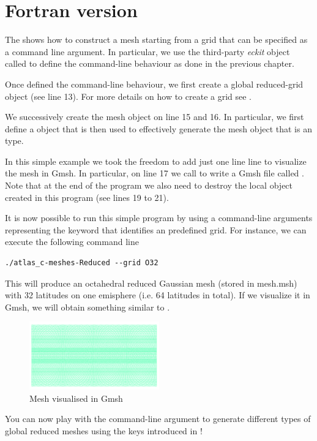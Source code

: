 \section{Fortran version}
The  shows how to construct a mesh 
starting from a grid that can be specified as a command 
line argument. In particular, we use the third-party 
\textit{eckit} object called  to define 
the command-line behaviour as done in the previous chapter. 
 
%

%
Once defined the command-line behaviour, we first create 
a global reduced-grid object (see line 13). For more 
details on how to create a grid see .

We successively create the mesh object on line 15 and 16.
In particular, we first define a  
object that is then used to effectively generate the mesh object 
 that is an  type.

In this simple example we took the freedom to add just one line 
line to visualize the mesh in Gmsh. In particular, on line 17 
we call  to write a Gmsh file called 
. Note that at the end of the program we also 
need to destroy the local object created in this program (see 
lines 19 to 21).

It is now possible to run this simple program by using 
a command-line arguments representing the keyword that 
identifies an \Atlas predefined grid. For instance, 
we can execute the following command line
%
\begin{lstlisting}[style=BashStyle]
./atlas_c-meshes-Reduced --grid O32
\end{lstlisting}
% 
This will produce an octahedral reduced Gaussian mesh 
(stored in mesh.msh) with 32 latitudes on one emisphere 
(i.e. 64 latitudes in total).
If we visualize it in Gmsh, we will obtain something similar
to .
%
\begin{figure}%
\centering
\includegraphics[width=0.5\textwidth]{imgs/O32-2D.png}
\caption{Mesh visualised in Gmsh}%
\label{fig:meshes}%
\end{figure}
%
You can now play with the command-line argument to generate 
different types of global reduced meshes using the keys 
introduced in !
